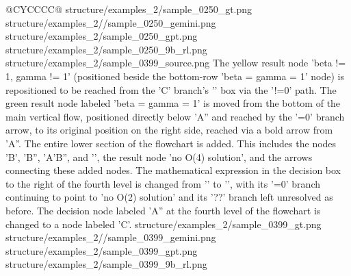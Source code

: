 \begin{table}[t]
\begin{tabularx}{\textwidth}{@{}CYCCCC@{}}
    {structure/examples_2/sample_0250_gt.png}
    {structure/examples_2//sample_0250_gemini.png}
    {structure/examples_2/sample_0250_gpt.png}
    {structure/examples_2/sample_0250_9b_rl.png}
    \midrule
    \exrowtwoseven
    {structure/examples_2/sample_0399_source.png}
    {The yellow result node 'beta != 1, gamma != 1' (positioned beside the bottom-row 'beta = gamma = 1' node) is repositioned to be reached from the 'C' branch's '' box via the '!=0' path. The green result node labeled 'beta = gamma = 1' is moved from the bottom of the main vertical flow, positioned directly below 'A'' and reached by the '=0' branch arrow, to its original position on the right side, reached via a bold arrow from 'A''. The entire lower section of the flowchart is added. This includes the nodes 'B', 'B'', 'A'B'', and '', the result node 'no O(4) solution', and the arrows connecting these added nodes. The mathematical expression in the decision box to the right of the fourth level is changed from '' to '', with its '=0' branch continuing to point to 'no O(2) solution' and its '??' branch left unresolved as before. The decision node labeled 'A'' at the fourth level of the flowchart is changed to a node labeled 'C'.}
    {structure/examples_2/sample_0399_gt.png}
    {structure/examples_2//sample_0399_gemini.png}
    {structure/examples_2/sample_0399_gpt.png}
    {structure/examples_2/sample_0399_9b_rl.png}
    
    \bottomrule
\end{tabularx}
\end{table}